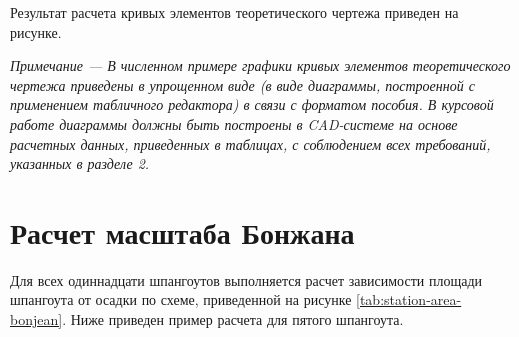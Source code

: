 Результат расчета кривых элементов теоретического чертежа приведен на рисунке.

\textit{
    Примечание --- В численном примере графики кривых элементов теоретического чертежа приведены в упрощенном виде (в виде диаграммы, построенной с применением табличного редактора) в связи с форматом пособия.
    В курсовой работе диаграммы должны быть построены  в CAD-системе на основе расчетных данных, приведенных в таблицах, с соблюдением всех требований, указанных в разделе 2.
}

\begin{figure}[H]
    \centerline{}
    \caption{Кривые элементов теоретического чертежа}
    \caption*{\textit{}}
\end{figure}

\newpage
\section{Расчет масштаба Бонжана}

Для всех одиннадцати шпангоутов выполняется расчет зависимости площади шпангоута от осадки по схеме, приведенной на рисунке \ref{tab:station-area-bonjean}.
Ниже приведен пример расчета для пятого шпангоута.

\begin{table}[H]
    \centering
    \scriptsize
    \caption{Пример расчета зависимости площади шпангоута от осадки}
    \caption*{\textit{
        Схема расчета приведена на рисунке \ref{tab:station-area-bonjean}.
        Расчет выполнен для пятого шпангоута.
    }}
\end{table}

